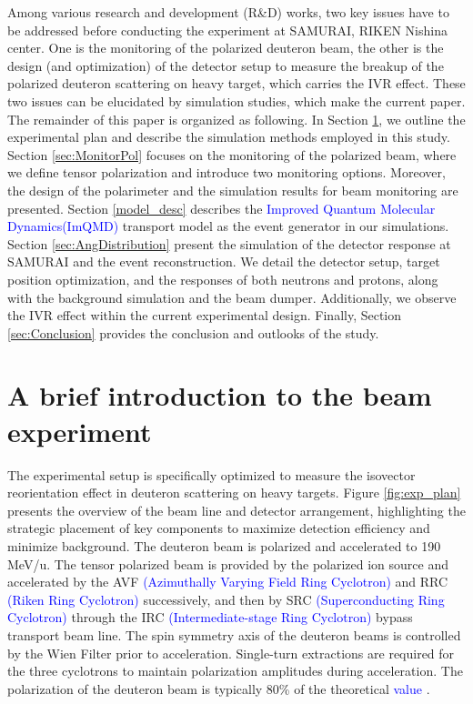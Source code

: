\documentclass[twocolumn,twoside,showpacs,showkeys,preprintnumbers,superscriptaddress,amsmath,amssymb,prc,nofootinbib,a4paper]{revtex4}
\begin{document}
Among various research and development (R\&D) works, two key issues have to be addressed before conducting the experiment at SAMURAI, RIKEN Nishina center.  One is the monitoring of the polarized deuteron beam, the other is the design (and optimization) of the detector setup to measure the breakup of the polarized deuteron scattering on heavy target, which carries the IVR effect. These two issues can be elucidated by simulation studies, which make the current paper. The remainder of this paper is organized as following. In Section \ref{sec:exp_plan}, we outline the experimental plan and describe the simulation methods employed in this study. Section \ref{sec:MonitorPol} focuses on the monitoring of the polarized beam, where we define tensor polarization and introduce two monitoring options. Moreover,   the design of the polarimeter and  the simulation results for beam monitoring are presented. Section \ref{model_desc} describes the \textcolor{blue}{Improved Quantum Molecular Dynamics(ImQMD)} transport model as the event generator in our simulations. Section \ref{sec:AngDistribution} present the simulation of the detector response at SAMURAI and the event reconstruction. We detail the detector setup, target position optimization, and the responses of both neutrons and protons, along with the background simulation and the beam dumper. Additionally, we observe the IVR effect within the current experimental design. Finally, Section \ref{sec:Conclusion} provides the conclusion and outlooks of the study.
  


\section{A brief introduction to the beam experiment}
\label{sec:exp_plan}

The experimental setup is specifically optimized to measure the isovector reorientation effect in deuteron scattering on heavy targets. Figure \ref{fig:exp_plan} presents the overview of the beam line and detector arrangement, highlighting the strategic placement of key components to maximize detection efficiency and minimize background. The deuteron beam is polarized and accelerated to 190 MeV/u. The tensor polarized beam is provided by the polarized ion source and accelerated by the AVF \textcolor{blue}{(Azimuthally Varying Field Ring Cyclotron)} and RRC \textcolor{blue}{(Riken Ring Cyclotron)} successively, and then by SRC \textcolor{blue}{(Superconducting Ring Cyclotron)} through the IRC \textcolor{blue}{(Intermediate-stage Ring Cyclotron)} bypass transport beam line. The spin symmetry axis of the deuteron beams is controlled by the Wien Filter prior to acceleration. Single-turn extractions are required for the three cyclotrons to maintain polarization amplitudes during acceleration. The polarization of the deuteron beam
is typically 80\% of the theoretical \textcolor{blue}{value \cite{sakamoto2016acceleration}}.
\end{document}
